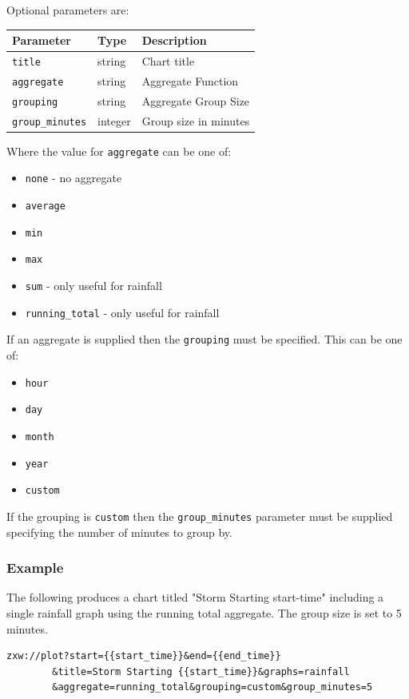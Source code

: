 \documentclass[a4paper,10pt]{book}
\begin{document}
Optional parameters are:

\begin{tabular}{p{2.5cm} p{2.5cm} l}
\hline
\textbf{Parameter} & \textbf{Type} & \textbf{Description} \\
\hline
\verb|title| & string & Chart title \\
\verb|aggregate| & string & Aggregate Function \\
\verb|grouping| & string & Aggregate Group Size \\
\verb|group_minutes| & integer & Group size in minutes \\
\hline
\end{tabular}

Where the value for \verb|aggregate| can be one of:

\begin{itemize}
\item \verb|none| - no aggregate
\item \verb|average|
\item \verb|min|
\item \verb|max|
\item \verb|sum| - only useful for rainfall
\item \verb|running_total| - only useful for rainfall
\end{itemize}

If an aggregate is supplied then the \verb|grouping| must be specified. This can be one of:

\begin{itemize}
\item \verb|hour|
\item \verb|day|
\item \verb|month|
\item \verb|year|
\item \verb|custom|
\end{itemize}

If the grouping is \verb|custom| then the \verb|group_minutes| parameter must be supplied specifying the number of minutes to group by.

\subsubsection{Example}
The following produces a chart titled "Storm Starting start-time" including a single rainfall graph using the running total aggregate. The group size is set to 5 minutes.
\begin{verbatim}
zxw://plot?start={{start_time}}&end={{end_time}}
        &title=Storm Starting {{start_time}}&graphs=rainfall
        &aggregate=running_total&grouping=custom&group_minutes=5
\end{verbatim}
\end{document}
